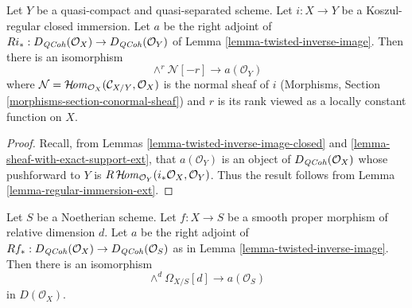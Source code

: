 \begin{lemma}
\label{lemma-regular-immersion}
Let $Y$ be a quasi-compact and quasi-separated scheme.
Let $i : X \to Y$ be a Koszul-regular closed immersion.
Let $a$ be the right adjoint of
$Ri_* : D_{\mathit{QCoh}}(\mathcal{O}_X) \to D_{\mathit{QCoh}}(\mathcal{O}_Y)$ of
Lemma \ref{lemma-twisted-inverse-image}. Then there is an isomorphism
$$
\wedge^r\mathcal{N}[-r] \longrightarrow a(\mathcal{O}_Y)
$$
where
$\mathcal{N} = \mathop{\mathcal{H}\!\mathit{om}}\nolimits_{\mathcal{O}_X}(\mathcal{C}_{X/Y}, \mathcal{O}_X)$
is the normal sheaf of $i$
(Morphisms, Section \ref{morphisms-section-conormal-sheaf})
and $r$ is its rank viewed as a locally constant
function on $X$.
\end{lemma}

\begin{proof}
Recall, from Lemmas \ref{lemma-twisted-inverse-image-closed}
and \ref{lemma-sheaf-with-exact-support-ext},
that $a(\mathcal{O}_Y)$ is an object of $D_{\mathit{QCoh}}(\mathcal{O}_X)$ whose
pushforward to $Y$ is
$R\mathop{\mathcal{H}\!\mathit{om}}\nolimits_{\mathcal{O}_Y}(i_*\mathcal{O}_X, \mathcal{O}_Y)$.
Thus the result follows from Lemma \ref{lemma-regular-immersion-ext}.
\end{proof}

\begin{lemma}
\label{lemma-smooth-proper}
Let $S$ be a Noetherian scheme.
Let $f : X \to S$ be a smooth proper morphism of relative dimension $d$.
Let $a$ be the right adjoint of
$Rf_* : D_{\mathit{QCoh}}(\mathcal{O}_X) \to D_{\mathit{QCoh}}(\mathcal{O}_S)$ as in
Lemma \ref{lemma-twisted-inverse-image}. Then there is an isomorphism
$$
\wedge^d \Omega_{X/S}[d] \longrightarrow a(\mathcal{O}_S)
$$
in $D(\mathcal{O}_X)$.
\end{lemma}

